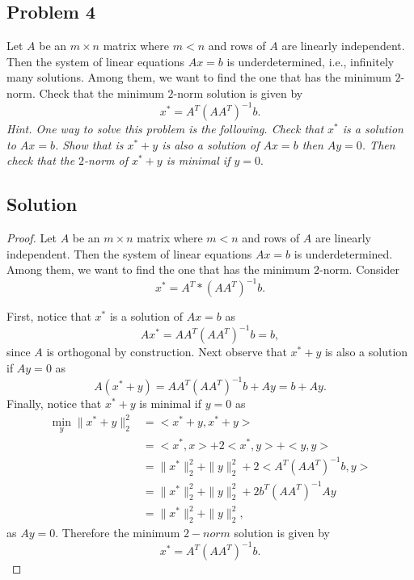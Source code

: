 \documentclass[12pt]{report}
\begin{document}


\begin{problem}%
\subsection*{Problem 4}

Let $A$ be an $m \times n$ matrix where $m < n$ and rows of $A$ are linearly independent. Then the system of linear equations $Ax = b$ is underdetermined, i.e., inﬁnitely many solutions. Among them, we want to ﬁnd the one that has the minimum $2$-norm. Check that the minimum $2$-norm solution is given by
\[
     x^* = A^T(AA^T)^{-1}b.
\]
\textit{Hint. One way to solve this problem is the following. Check that $x^*$ is a solution to $Ax = b$. Show that is $x^* + y$ is also a solution of $Ax = b$ then $Ay = 0$. Then check that the $2$-norm of $x^* + y$ is minimal if $y = 0.$}
\subsection*{Solution}
\begin{proof}

Let $A$ be an $m\times n$ matrix where $m < n$ and rows of $A$ are linearly independent. Then the system of linear equations $Ax = b$ is underdetermined. Among them, we want to ﬁnd the one that has the minimum $2$-norm. Consider
\[
      x^* = A^T*(AA^T)^{-1}b.
\]

First, notice that $x^*$ is a solution of $Ax = b$ as 
\[
      Ax^* = AA^T(AA^T)^{-1}b = b,
\]
since $A$ is orthogonal by construction. Next observe that $x^* + y$ is also a solution if $Ay = 0$ as
\[
      A(x^* + y) = AA^T(AA^T)^{-1}b + Ay = b + Ay.
\]
Finally, notice that $x^* + y$ is minimal if $y = 0$ as
\begin{align*}
     \min_y \|x^* + y\|_2^2 &= < x^* + y, x^* + y>\\
     &= <x^*,x> + 2<x^*,y> + <y,y>\\
     &= \|x^*\|_2^2 + \|y\|_2^2 + 2<A^T(AA^T)^{-1}b,y>\\
     &= \|x^*\|_2^2 + \|y\|_2^2 + 2b^T(AA^T)^{-1}Ay\\
     &= \|x^*\|_2^2 + \|y\|_2^2,
\end{align*} 
as $Ay = 0$. Therefore the minimum $2-norm$ solution is given by
\[
      x^* = A^T(AA^T)^{-1}b.
\]


\end{proof}
\end{problem}
\end{document}
